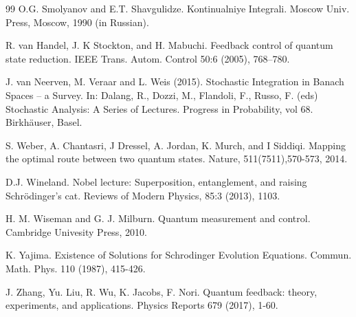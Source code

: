 \documentclass[12pt]{article}
\begin{document}
\begin{thebibliography}{99}
 O.G. Smolyanov and E.T. Shavgulidze. Kontinualniye Integrali.
Moscow Univ. Press, Moscow, 1990 (in Russian).

R. van Handel, J. K Stockton, and H. Mabuchi. Feedback control of
quantum state reduction. IEEE Trans. Autom. Control 50:6 (2005),
768–780.

J. van Neerven, M. Veraar and L. Weis (2015).
Stochastic Integration in Banach Spaces – a Survey.
In: Dalang, R., Dozzi, M., Flandoli, F., Russo, F. (eds) Stochastic Analysis:
A Series of Lectures. Progress in Probability, vol 68. Birkhäuser, Basel.

S. Weber, A. Chantasri, J Dressel, A. Jordan,
K. Murch, and I Siddiqi. Mapping the optimal route
between two quantum states. Nature, 511(7511),570-573,
2014.

D.J. Wineland. Nobel lecture: Superposition, entanglement, and raising
Schr\"odinger's cat. Reviews of Modern Physics, 85:3 (2013), 1103.

H. M.  Wiseman and G. J.  Milburn.
 Quantum measurement and control. Cambridge Univesity Press, 2010.

K. Yajima.
Existence of Solutions for Schrodinger Evolution Equations.
Commun. Math. Phys. 110 (1987),  415-426.

J. Zhang, Yu. Liu, R. Wu, K. Jacobs, F. Nori.
Quantum feedback: theory, experiments, and applications.
Physics Reports 679 (2017), 1-60.


\end{thebibliography}
\end{document}
